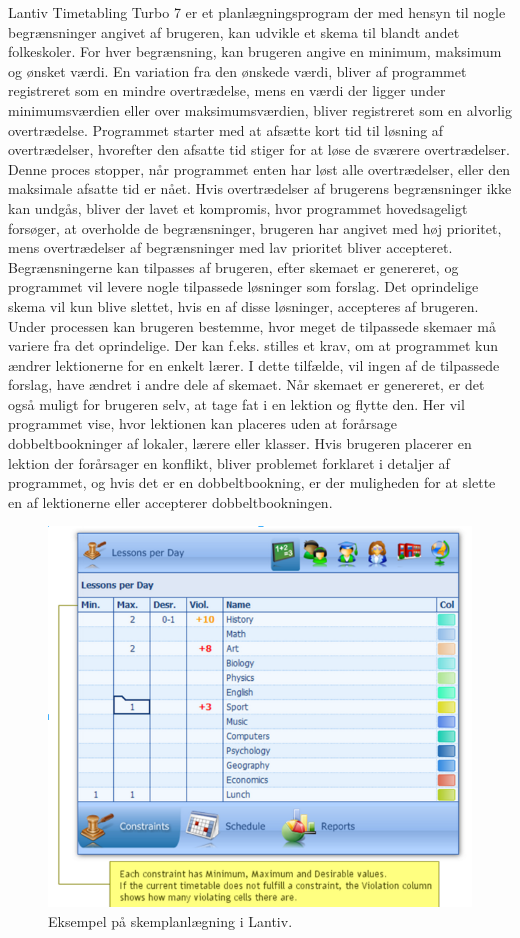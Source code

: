 Lantiv Timetabling Turbo 7 er et planlægningsprogram der med hensyn til nogle begrænsninger angivet af brugeren, kan udvikle et skema til blandt andet folkeskoler. For hver begrænsning, kan brugeren angive en minimum, maksimum og ønsket værdi. En variation fra den ønskede værdi, bliver af programmet registreret som en mindre overtrædelse, mens en værdi der ligger under minimumsværdien eller over maksimumsværdien, bliver registreret som en alvorlig overtrædelse. Programmet starter med at afsætte kort tid til løsning af overtrædelser, hvorefter den afsatte tid stiger for at løse de sværere overtrædelser. Denne proces stopper, når programmet enten har løst alle overtrædelser, eller den maksimale afsatte tid er nået. Hvis overtrædelser af brugerens begrænsninger ikke kan undgås, bliver der lavet et kompromis, hvor programmet hovedsageligt forsøger, at overholde de begrænsninger, brugeren har angivet med høj prioritet, mens overtrædelser af begrænsninger med lav prioritet bliver accepteret. Begrænsningerne kan tilpasses af brugeren, efter skemaet er genereret, og programmet vil levere nogle tilpassede løsninger som forslag. Det oprindelige skema vil kun blive slettet, hvis en af disse løsninger, accepteres af brugeren. Under processen kan brugeren bestemme, hvor meget de tilpassede skemaer må variere fra det oprindelige. Der kan f.eks. stilles et krav, om at programmet kun ændrer lektionerne for en enkelt lærer. I dette tilfælde, vil ingen af de tilpassede forslag, have ændret i andre dele af skemaet. Når skemaet er genereret, er det også muligt for brugeren selv, at tage fat i en lektion og flytte den. Her vil programmet vise, hvor lektionen kan placeres uden at forårsage dobbeltbookninger af lokaler, lærere eller klasser. Hvis brugeren placerer en lektion der forårsager en konflikt, bliver problemet forklaret i detaljer af programmet, og hvis det er en dobbeltbookning, er der muligheden for at slette en af lektionerne eller accepterer dobbeltbookningen.\cite{lantiv2016}
\begin{figure}[!h]
  \centering
  \includegraphics[width=\textwidth]{partials/graphics/LANTIV.png}
    \caption{Eksempel på skemplanlægning i Lantiv\cite{lantivb}.}
  \label{fig:lantiv}
\end{figure}

